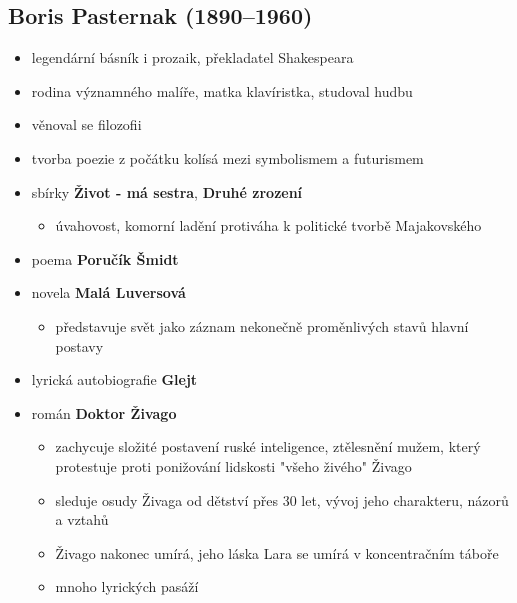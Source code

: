 \subsection{Boris Pasternak (1890--1960)}
\begin{itemize}
\item legendární básník i prozaik, překladatel Shakespeara
\item rodina významného malíře, matka klavíristka, studoval hudbu
\item věnoval se filozofii
\item tvorba poezie z počátku kolísá mezi symbolismem a futurismem
\item sbírky \textbf{Život - má sestra}, \textbf{Druhé zrození}
	\begin{itemize}
	\item úvahovost, komorní ladění \ra protiváha k politické tvorbě Majakovského
	\end{itemize}
\item poema \textbf{Poručík Šmidt}
\item novela \textbf{Malá Luversová}
	\begin{itemize}
	\item představuje svět jako záznam nekonečně proměnlivých stavů hlavní postavy
	\end{itemize}	 
\item lyrická autobiografie \textbf{Glejt}
\item román \textbf{Doktor Živago}
	\begin{itemize}
	\item zachycuje složité postavení ruské inteligence, ztělesnění mužem, který protestuje proti ponižování lidskosti "všeho živého" \ra Živago
	\item sleduje osudy Živaga od dětství přes 30 let, vývoj jeho charakteru, názorů a vztahů
	\item Živago nakonec umírá, jeho láska Lara se umírá v koncentračním táboře
	\item mnoho lyrických pasáží
	\end{itemize}
\end{itemize}

